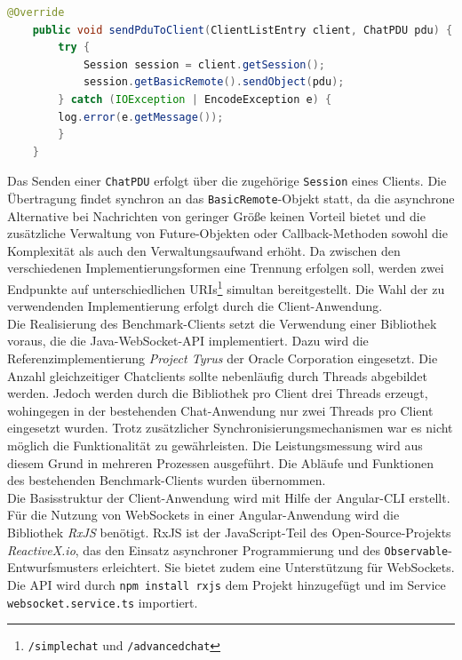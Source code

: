 \documentclass[11pt,a4paper,titlepage]{scrartcl}
\numberwithin{equation}{section}
\begin{document}
\begin{lstlisting}[frame=single, language=Java, caption=Senden einer ChatPDU, label=lst:wsServerPDU]
	@Override
	public void sendPduToClient(ClientListEntry client, ChatPDU pdu) {
		try {
			Session session = client.getSession();
			session.getBasicRemote().sendObject(pdu);
		} catch (IOException | EncodeException e) {
		log.error(e.getMessage());
		}
	}
\end{lstlisting}

\noindent Das Senden einer \texttt{ChatPDU} erfolgt über die zugehörige \texttt{Session} eines Clients. Die Übertragung findet synchron an das \texttt{BasicRemote}-Objekt statt, da die asynchrone Alternative bei Nachrichten von geringer Größe keinen Vorteil bietet und die zusätzliche Verwaltung von Future-Objekten oder Callback-Methoden sowohl die Komplexität als auch den Verwaltungsaufwand erhöht. Da zwischen den verschiedenen Implementierungsformen eine Trennung erfolgen soll, werden zwei Endpunkte auf unterschiedlichen URIs\footnote{\texttt{/simplechat} und \texttt{/advancedchat}} simultan bereitgestellt. Die Wahl der zu verwendenden Implementierung erfolgt durch die Client-Anwendung. \\

\noindent Die Realisierung des Benchmark-Clients setzt die Verwendung einer Bibliothek voraus, die die Java-WebSocket-API implementiert. Dazu wird die Referenzimplementierung \textit{Project Tyrus} der Oracle Corporation eingesetzt. Die Anzahl gleichzeitiger Chatclients sollte nebenläufig durch Threads abgebildet werden. Jedoch werden durch die Bibliothek pro Client drei Threads erzeugt, wohingegen in der bestehenden Chat-Anwendung nur zwei Threads pro Client eingesetzt wurden. Trotz zusätzlicher Synchronisierungsmechanismen war es nicht möglich die Funktionalität zu gewährleisten. Die Leistungsmessung wird aus diesem Grund in mehreren Prozessen ausgeführt. Die Abläufe und Funktionen des bestehenden Benchmark-Clients wurden übernommen.\\

\noindent Die Basisstruktur der Client-Anwendung wird mit Hilfe der Angular-CLI erstellt. Für die Nutzung von WebSockets in einer Angular-Anwendung wird die Bibliothek \textit{RxJS} benötigt. RxJS ist der JavaScript-Teil des Open-Source-Projekts \textit{ReactiveX.io}, das den Einsatz asynchroner Programmierung und des \texttt{Observable}-Entwurfsmusters erleichtert. Sie bietet zudem eine Unterstützung für WebSockets. Die API wird durch \texttt{npm install rxjs} dem Projekt hinzugefügt und im Service \texttt{websocket.service.ts} importiert.\medskip
\end{document}
